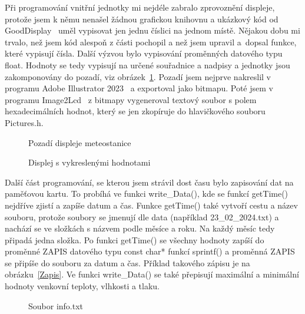             Při programování vnitřní jednotky mi nejdéle zabralo zprovoznění displeje, protože jsem k němu nenašel žádnou grafickou knihovnu a ukázkový kód od GoodDisplay~\cite{EpaperLibrary} uměl vypisovat jen jednu číslici na jednom místě. Nějakou dobu mi trvalo, než jsem kód alespoň z části pochopil a než jsem upravil a~dopsal funkce, které vypisují čísla. Další výzvou bylo vypisování proměnných datového typu float. Hodnoty se tedy vypisují na určené souřadnice a nadpisy a jednotky jsou zakomponovány do pozadí, viz obrázek~\ref{Pozadi}. Pozadí jsem nejprve nakreslil v programu Adobe Illustrator 2023~\cite{Illustrator} a exportoval jako bitmapu. Poté jsem v programu Image2Lcd~\cite{Image2Lcd} z bitmapy vygeneroval textový soubor s polem hexadecimálních hodnot, který se jen zkopíruje do hlavičkového souboru Pictures.h.

            \begin{figure}[htb]
            \caption{Pozadí displeje meteostanice}
            \label{Pozadi}
            \end{figure}
            
            \begin{figure}[htb]
            \caption{Displej s vykreslenými hodnotami}
            \label{Displej}
            \end{figure}

        \clearpage

            Další část programování, se kterou jsem strávil dost času bylo zapisování dat na paměťovou kartu. To probíhá ve funkci \hbox{write\_Data()}, kde se funkcí getTime() nejdříve zjistí a zapíše datum a čas. Funkce getTime() také vytvoří cestu a název souboru, protože soubory se jmenují dle data (například \hbox{23\_02\_2024.txt)} a nachází se ve složkách s názvem podle měsíce a roku. Na každý měsíc tedy připadá jedna složka. Po funkci getTime() se všechny hodnoty zapíší do proměnné ZAPIS datového typu const char* funkcí sprintf() a proměnná ZAPIS se připíše do souboru za datum a čas. Příklad takového zápisu je na obrázku~\ref{Zapis}. Ve funkci \hbox{write\_Data()} se také přepisují maximální a minimální hodnoty venkovní teploty, vlhkosti a tlaku.

            \begin{figure}[htb]
            \caption{Soubor info.txt}
            \label{Info}
            \end{figure}

